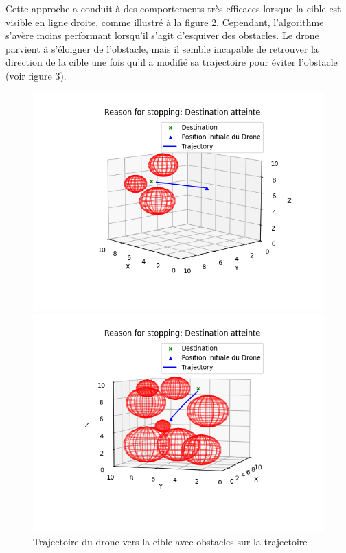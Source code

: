 \documentclass[a4paper, 12pt]{article}
\begin{document}
Cette approche a conduit à des comportements très efficaces lorsque la cible est visible en ligne droite, comme illustré à la figure 2. Cependant, l'algorithme s'avère moins performant lorsqu'il s'agit d'esquiver des obstacles. Le drone parvient à s'éloigner de l'obstacle, mais il semble incapable de retrouver la direction de la cible une fois qu'il a modifié sa trajectoire pour éviter l'obstacle (voir figure 3).
\begin{figure}[h]
    \centering
    \begin{minipage}{0.45\textwidth}
        \centering
        \includegraphics[width=\textwidth]{Figure_7.png}
    \end{minipage}
    \hfill
    \begin{minipage}{0.45\textwidth}
        \centering
        \includegraphics[width=\textwidth]{Figure_8.png}
    \end{minipage}
    \caption{Trajectoire du drone vers la cible avec obstacles sur la trajectoire}
\end{figure}
\end{document}
